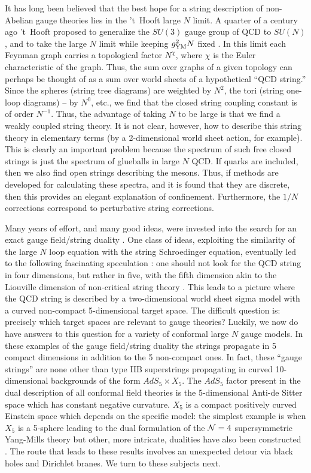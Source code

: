 It has long been believed that the best hope for a string description
of non-Abelian gauge theories lies in the 't~Hooft large $N$ limit.
A quarter of a century ago 't~Hooft proposed to generalize the $SU(3)$
gauge group of QCD to $SU(N)$, and to take the large $N$ limit while keeping
$g_{{\rm YM}}^2 N$ fixed \cite{GT}. In this limit each Feynman graph carries
a topological factor $N^\chi$, where $\chi$ is the Euler
characteristic of the graph.
Thus, the sum over graphs of a given topology can perhaps be thought of
as a sum over world sheets of a hypothetical ``QCD string.'' 
Since the spheres (string tree diagrams)
are weighted by $N^2$, the tori (string one-loop diagrams) -- 
by $N^0$, etc., we find that the closed string coupling constant is of order
$N^{-1}$. Thus, the advantage of taking $N$ to be large is that we find
a weakly coupled string theory. It is not clear, however, how to describe
this string theory in elementary terms (by a 2-dimensional world sheet action, 
for example). This is clearly an important problem because the 
spectrum  of such free closed strings is just the  
spectrum of glueballs in large $N$ QCD.
If quarks are included, then we also find open strings describing the 
mesons. Thus, if methods are developed for calculating these spectra,
and it is found that they are discrete, then
this provides an elegant
explanation of confinement. Furthermore, the $1/N$ corrections 
correspond to perturbative string corrections.

Many years of effort, and many good ideas, were invested into the search
for an exact gauge field/string duality \cite{book}. 
One class of ideas, exploiting
the similarity of the large $N$ loop equation with the string Schroedinger
equation, eventually led to the following fascinating 
speculation \cite{Sasha}:
one should not look for the QCD string in four dimensions, but rather
in five, with the fifth dimension akin to the Liouville dimension of
non-critical string theory \cite{bos}. This leads to a picture
where the QCD string is described by a two-dimensional world sheet
sigma model with a curved non-compact 5-dimensional target space. 
The difficult question is:
precisely which target spaces are relevant to gauge theories?
Luckily, we now do have answers to this question for a variety of
conformal large $N$ gauge models. In these
examples of the gauge field/string duality the strings
propagate in 5 compact dimensions in addition to the 5 non-compact
ones. In fact, these ``gauge strings'' are none other than type IIB
superstrings propagating in curved 10-dimensional backgrounds of the
form $AdS_5\times X_5$. The $AdS_5$ factor
present in the dual description of all conformal
field theories is the 5-dimensional Anti-de Sitter
space which has constant negative curvature. $X_5$ is a compact 
positively curved Einstein space which depends on the specific model: the
simplest example is when $X_5$ is a 5-sphere leading to the dual
formulation of the ${\cal N}=4$ supersymmetric Yang-Mills theory
\cite{jthroat,US,EW} but
other, more intricate, dualities have also been constructed
\cite{ks,lnv,KW}.
The route that leads to these results 
involves an unexpected detour via black holes and Dirichlet branes.
We turn to these subjects next.


